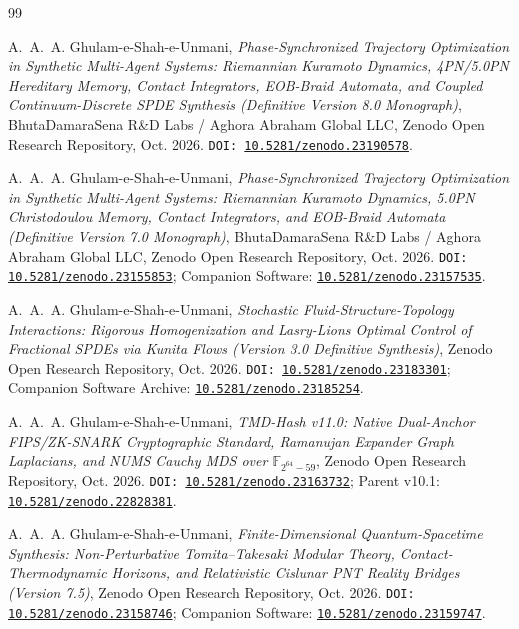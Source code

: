 \documentclass[11pt,a4paper,reqno]{article}
\theoremstyle{plain}
\theoremstyle{definition}
\theoremstyle{remark}
\numberwithin{equation}{section}
\begin{document}
\begin{thebibliography}{99}

A.~A.~A. Ghulam-e-Shah-e-Unmani, \emph{Phase-Synchronized Trajectory Optimization in Synthetic Multi-Agent Systems: Riemannian Kuramoto Dynamics, 4PN/5.0PN Hereditary Memory, Contact Integrators, EOB-Braid Automata, and Coupled Continuum-Discrete SPDE Synthesis (Definitive Version 8.0 Monograph)}, BhutaDamaraSena R\&D Labs / Aghora Abraham Global LLC, Zenodo Open Research Repository, Oct. 2026. \texttt{DOI: \href{https://doi.org/10.5281/zenodo.23190578}{10.5281/zenodo.23190578}}.

A.~A.~A. Ghulam-e-Shah-e-Unmani, \emph{Phase-Synchronized Trajectory Optimization in Synthetic Multi-Agent Systems: Riemannian Kuramoto Dynamics, 5.0PN Christodoulou Memory, Contact Integrators, and EOB-Braid Automata (Definitive Version 7.0 Monograph)}, BhutaDamaraSena R\&D Labs / Aghora Abraham Global LLC, Zenodo Open Research Repository, Oct. 2026. \texttt{DOI: \href{https://doi.org/10.5281/zenodo.23155853}{10.5281/zenodo.23155853}}; Companion Software: \texttt{\href{https://doi.org/10.5281/zenodo.23157535}{10.5281/zenodo.23157535}}.

A.~A.~A. Ghulam-e-Shah-e-Unmani, \emph{Stochastic Fluid-Structure-Topology Interactions: Rigorous Homogenization and Lasry-Lions Optimal Control of Fractional SPDEs via Kunita Flows (Version 3.0 Definitive Synthesis)}, Zenodo Open Research Repository, Oct. 2026. \texttt{DOI: \href{https://doi.org/10.5281/zenodo.23183301}{10.5281/zenodo.23183301}}; Companion Software Archive: \texttt{\href{https://doi.org/10.5281/zenodo.23185254}{10.5281/zenodo.23185254}}.

A.~A.~A. Ghulam-e-Shah-e-Unmani, \emph{TMD-Hash v11.0: Native Dual-Anchor FIPS/ZK-SNARK Cryptographic Standard, Ramanujan Expander Graph Laplacians, and NUMS Cauchy MDS over $\mathbb{F}_{2^{64}-59}$}, Zenodo Open Research Repository, Oct. 2026. \texttt{DOI: \href{https://doi.org/10.5281/zenodo.23163732}{10.5281/zenodo.23163732}}; Parent v10.1: \texttt{\href{https://doi.org/10.5281/zenodo.22828381}{10.5281/zenodo.22828381}}.

A.~A.~A. Ghulam-e-Shah-e-Unmani, \emph{Finite-Dimensional Quantum-Spacetime Synthesis: Non-Perturbative Tomita--Takesaki Modular Theory, Contact-Thermodynamic Horizons, and Relativistic Cislunar PNT Reality Bridges (Version 7.5)}, Zenodo Open Research Repository, Oct. 2026. \texttt{DOI: \href{https://doi.org/10.5281/zenodo.23158746}{10.5281/zenodo.23158746}}; Companion Software: \texttt{\href{https://doi.org/10.5281/zenodo.23159747}{10.5281/zenodo.23159747}}.


\end{thebibliography}
\end{document}
